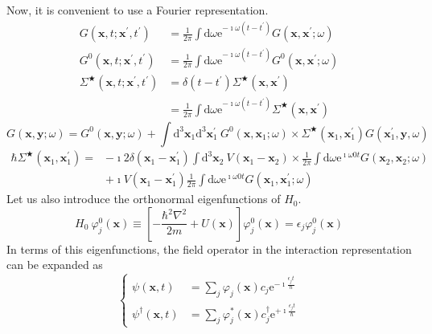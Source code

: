 Now, it is convenient to use a Fourier representation.
\[ \begin{split}
G(\mathbf{x},t;\mathbf{x}^{'},t^{'})&=\frac{1}{2\pi}\int \mathrm{d} \omega \mathrm{e}^{-\imath \omega (t-t^{'})} G(\mathbf{x},\mathbf{x}^{'};\omega)\\
G^{0}(\mathbf{x},t;\mathbf{x}^{'},t^{'})&=\frac{1}{2\pi}\int \mathrm{d} \omega \mathrm{e}^{-\imath \omega (t-t^{'})} G^{0}(\mathbf{x},\mathbf{x}^{'};\omega)\\
\Sigma^{\bigstar}(\mathbf{x},t;\mathbf{x}^{'},t^{'})&=
\delta(t-t^{'})\Sigma^{\bigstar}(\mathbf{x},\mathbf{x}^{'})\\
&=\frac{1}{2\pi}\int \mathrm{d} \omega \mathrm{e}^{-\imath \omega (t-t^{'})}\Sigma^{\bigstar}(\mathbf{x},\mathbf{x}^{'})
\end{split} \]
\begin{equation}
G(\mathbf{x},\mathbf{y};\omega)=G^{0}(\mathbf{x},\mathbf{y};\omega)+\int \mathrm{d}^{3}\mathbf{x}_{1} \mathrm{d}^{3}\mathbf{x}^{'}_{1} \ G^{0}(\mathbf{x},\mathbf{x}_{1};\omega) \times \Sigma^{\bigstar}(\mathbf{x}_{1},\mathbf{x}^{'}_{1})G(\mathbf{x}^{'}_{1},\mathbf{y},\omega)
\label{Eqs2.6.1}\end{equation}
\begin{equation}\begin{split}
\hbar\Sigma^{\bigstar}(\mathbf{x}_{1},\mathbf{x}^{'}_{1})
=&-\imath 2 \delta(\mathbf{x}_{1}-\mathbf{x}^{'}_{1}) \int \mathrm{d}^{3}\mathbf{x}_{2} \ V(\mathbf{x}_{1}-\mathbf{x}_{2}) \times \frac{1}{2\pi}\int \mathrm{d} \omega \mathrm{e}^{\imath \omega 0 t} G(\mathbf{x}_{2},\mathbf{x}_{2};\omega)\\
&+\imath V(\mathbf{x}_{1}-\mathbf{x}^{'}_{1}) \frac{1}{2\pi}\int \mathrm{d} \omega \mathrm{e}^{\imath \omega 0 t} G(\mathbf{x}_{1},\mathbf{x}_{1}^{'};\omega)
\end{split}\label{Eqs2.6.2}\end{equation}
Let us also introduce the orthonormal eigenfunctions of $H_{0}$.
\[ H_{0} \ \varphi_{j}^{0}(\mathbf{x}) \equiv \left[ -\frac{\hbar^{2}\nabla^{2}}{2m} + U(\mathbf{x}) \right]\varphi_{j}^{0}(\mathbf{x}) = \epsilon_{j}\varphi_{j}^{0}(\mathbf{x}) \]
In terms of  this eigenfunctions, the field operator in the interaction representation can be expanded as
\[ \left \{ \begin{split}
\psi(\mathbf{x},t) &= \sum_{j} \varphi_{j}(\mathbf{x})c_{j}\mathrm{e}^{-\imath\frac{\epsilon_{j}t}{\hbar}}\\
\psi^{\dagger}(\mathbf{x},t) &= \sum_{j} \varphi^{*}_{j}(\mathbf{x})c_{j}^{\dagger}\mathrm{e}^{+\imath\frac{\epsilon_{j}t}{\hbar}}
\end{split} \right. \]
